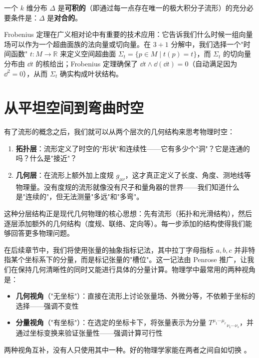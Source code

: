 \begin{theorem}[Frobenius 定理]
一个 $k$ 维分布 $\Delta$ 是\textbf{可积的}（即通过每一点存在唯一的极大积分子流形）的充分必要条件是：$\Delta$ 是\textbf{对合的}。
\end{theorem}

\begin{note}[物理意义]
Frobenius 定理在广义相对论中有重要的技术应用：它告诉我们什么时候一组向量场可以作为一个超曲面族的法向量或切向量。在 $3+1$ 分解中，我们选择一个"时间函数" $t: M \to \mathbb{R}$ 来定义空间超曲面 $\Sigma_t = \{p \in M \mid t(p) = t\}$，而 $\Sigma_t$ 的切向量分布由 $\dd t$ 的核给出；Frobenius 定理确保了 $\dd t \wedge \dd(\dd t) = 0$（自动满足因为 $\dd^2=0$），从而 $\Sigma_t$ 确实构成叶状结构。
\end{note}

\section{从平坦空间到弯曲时空}

\begin{note}[物理意义]
有了流形的概念之后，我们就可以从两个层次的几何结构来思考物理时空：
\begin{enumerate}
    \item \textbf{拓扑层}：流形定义了时空的"形状"和连续性——它有多少个"洞"？它是连通的吗？什么是"接近"？
    \item \textbf{几何层}：在流形上额外加上度规 $g_{\mu\nu}$，这才真正定义了长度、角度、测地线等物理量。没有度规的流形就像没有尺子和量角器的世界——我们知道什么是"连续的"，但无法测量"多远"和"多弯"。
\end{enumerate}
这种分层结构正是现代几何物理的核心思想：先有流形（拓扑和光滑结构），然后逐层添加额外的几何结构（度规、联络、定向等）。每一步添加的结构使得我们能够回答更多物理问题。
\end{note}

\begin{remark}[抽象指标与具体指标]
在后续章节中，我们将使用张量的抽象指标记法，其中拉丁字母指标 $a,b,c$ 并非特指某个坐标系下的分量，而是标记张量的"槽位"。这一记法由 Penrose 推广，让我们在保持几何清晰性的同时又能进行具体的分量计算。物理学中最常用的两种视角是：
\begin{itemize}
    \item \textbf{几何视角}（"无坐标"）：直接在流形上讨论张量场、外微分等，不依赖于坐标的选择——强调不变性
    \item \textbf{分量视角}（"有坐标"）：在选定的坐标卡下，将张量表示为分量 $T^{\mu_1\cdots\mu_r}{}_{\nu_1\cdots\nu_s}$，并通过坐标变换来验证张量性——强调计算可行性
\end{itemize}
两种视角互补，没有人只使用其中一种。好的物理学家能在两者之间自如切换 \cite{Reall_Part3_GR}。
\end{remark}

